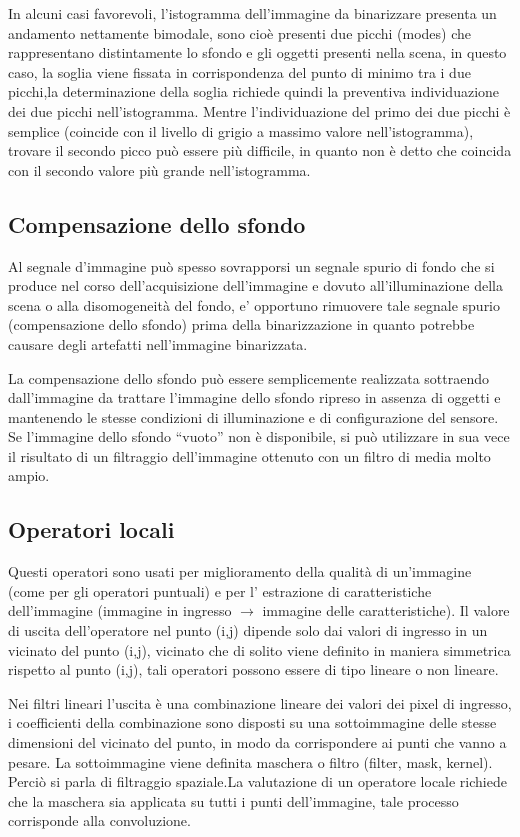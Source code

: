 In alcuni casi favorevoli, l’istogramma  dell’immagine da binarizzare presenta
un  andamento nettamente bimodale, sono cioè presenti due picchi (modes) che
rappresentano distintamente lo sfondo e gli  oggetti presenti nella scena, in
questo caso, la soglia viene fissata in  corrispondenza del punto di minimo
tra i due  picchi,la determinazione della soglia richiede quindi  la
preventiva individuazione dei due picchi  nell’istogramma. Mentre
l’individuazione del primo dei due  picchi è semplice (coincide con il livello
di  grigio a massimo valore nell’istogramma),  trovare il secondo picco può
essere più  difficile, in quanto non è detto che coincida  con il secondo
valore più grande  nell’istogramma.

\subsection{Compensazione dello sfondo}

Al segnale d’immagine può spesso  sovrapporsi un segnale spurio di fondo che
si  produce nel corso dell’acquisizione  dell’immagine e dovuto
all’illuminazione della  scena o alla disomogeneità del fondo, e’ opportuno
rimuovere tale segnale spurio  (compensazione dello sfondo) prima della
binarizzazione in quanto potrebbe causare  degli artefatti nell’immagine
binarizzata.

La compensazione dello sfondo può essere  semplicemente realizzata
sottraendo  dall’immagine da trattare l’immagine dello  sfondo ripreso in
assenza di oggetti e  mantenendo le stesse condizioni di  illuminazione e di
configurazione del sensore. Se l’immagine dello sfondo “vuoto” non è
disponibile, si può utilizzare in sua vece il  risultato di un filtraggio
dell’immagine  ottenuto con un filtro di media molto ampio.

\subsection{Operatori locali}
Questi operatori sono usati per miglioramento della qualità di un’immagine (come per gli 
operatori puntuali) e per l' estrazione di caratteristiche dell’immagine (immagine in 
ingresso $\to$ immagine delle caratteristiche).
Il valore di uscita dell’operatore nel punto (i,j) 
dipende solo dai valori di ingresso in un vicinato del 
punto (i,j), vicinato che di solito viene definito in maniera simmetrica 
rispetto al punto (i,j), tali operatori possono essere di tipo lineare o non lineare.

Nei filtri lineari l’uscita è una combinazione lineare dei valori dei 
pixel di ingresso, i coefficienti della combinazione sono disposti su una 
sottoimmagine delle stesse dimensioni del vicinato del punto, in
modo da corrispondere ai punti che vanno a pesare.
La sottoimmagine viene definita maschera o filtro (filter, mask, 
kernel). Perciò si parla di filtraggio spaziale.La valutazione di un 
operatore locale richiede che la maschera sia applicata su tutti i punti 
dell’immagine, tale processo corrisponde alla convoluzione. 

